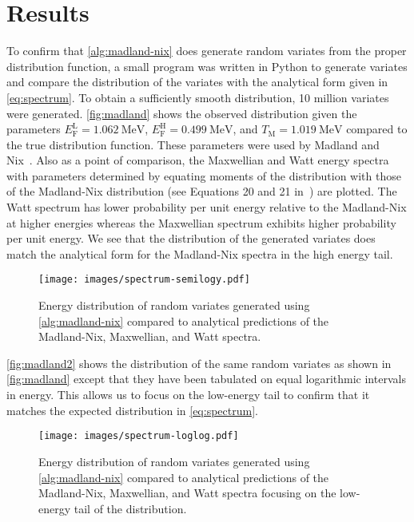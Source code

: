 \documentclass[5p]{elsarticle}
\newcommand{\tmax}{T_{\mathrm{M}}}
\newcommand{\efl}{E_{\mathrm{F}}^{\mathrm{L}}}
\newcommand{\efh}{E_{\mathrm{F}}^{\mathrm{H}}}
\begin{document}
\section{Results}

To confirm that \autoref{alg:madland-nix} does generate random variates from the
proper distribution function, a small program was written in Python to generate
variates and compare the distribution of the variates with the analytical form
given in \autoref{eq:spectrum}. To obtain a sufficiently smooth distribution, 10
million variates were generated. \autoref{fig:madland} shows the observed
distribution given the parameters $\efl = \SI{1.062}{\mega\electronvolt}$, $\efh
= \SI{0.499}{\mega\electronvolt}$, and $\tmax = \SI{1.019}{\mega\electronvolt}$
compared to the true distribution function. These parameters were used by
Madland and Nix~\cite{nse-madland-1982}. Also as a point of comparison, the
Maxwellian and Watt energy spectra with parameters determined by equating
moments of the distribution with those of the Madland-Nix distribution (see
Equations 20 and 21 in~\cite{nse-madland-1982}) are plotted. The Watt spectrum
has lower probability per unit energy relative to the Madland-Nix at higher
energies whereas the Maxwellian spectrum exhibits higher probability per unit
energy. We see that the distribution of the generated variates does match the
analytical form for the Madland-Nix spectra in the high energy tail.
\begin{figure}[htbp]
  \centering \texttt{[image: images/spectrum-semilogy.pdf]}
  \caption{Energy distribution of random variates generated using
    \autoref{alg:madland-nix} compared to analytical predictions of the
    Madland-Nix, Maxwellian, and Watt spectra.}
  \label{fig:madland}
\end{figure}

\autoref{fig:madland2} shows the distribution of the same random variates as
shown in \autoref{fig:madland} except that they have been tabulated on equal
logarithmic intervals in energy. This allows us to focus on the low-energy tail
to confirm that it matches the expected distribution in \autoref{eq:spectrum}.
\begin{figure}[htbp]
  \centering
  \texttt{[image: images/spectrum-loglog.pdf]}
  \caption{Energy distribution of random variates generated using
    \autoref{alg:madland-nix} compared to analytical predictions of the
    Madland-Nix, Maxwellian, and Watt spectra focusing on the low-energy tail of
    the distribution.}
  \label{fig:madland2}
\end{figure}
\end{document}
